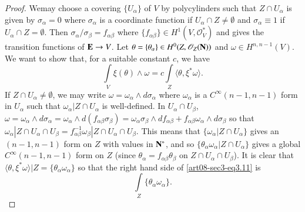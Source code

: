 \begin{proof}
We\pageoriginale may choose a covering $\{U_{\alpha}\}$ of $V$ by polycylinders such that $Z\cap U_{\alpha}$ is given by $\sigma_{\alpha}=0$ where $\sigma_{\alpha}$ is a coordinate function if $U_{\alpha}\cap Z\neq \emptyset$ and $\sigma_{\alpha}\equiv 1$ if $U_{\alpha}\cap Z=\emptyset$. Then $\sigma_{\alpha}/\sigma_{\beta}=f_{\alpha\beta}$ where $\{f_{\alpha\beta}\}\in H^{1}(V,\mathscr{O}^{*}_{V})$ and gives the transition functions of $\mathbf{E}\to V$. Let $\theta=\{\theta_{\alpha}\}\in H^{0}(Z,\mathscr{O}_{Z}(\mathbf{N}))$ and $\omega\in H^{n,n-1}(V)$. We want to show that, for a suitable constant $c$, we have
\begin{equation}
\int\limits_{V}\xi(\theta)\wedge \omega=c\int\limits_{Z}\langle \theta,\xi^{*}\omega\rangle.\label{art08-sec3-eq3.11}
\end{equation}
If $Z\cap U_{\alpha}\neq \emptyset$, we may write $\omega=\omega_{\alpha}\wedge d\sigma_{\alpha}$ where $\omega_{\alpha}$ is a $C^{\infty}(n-1,n-1)$ form in $U_{\alpha}$ such that $\omega_{\alpha}|Z\cap U_{\alpha}$ is well-defined. In $U_{\alpha}\cap U_{\beta}$, $\omega=\omega_{\alpha}\wedge d\sigma_{\alpha}=\omega_{\alpha}\wedge d(f_{\alpha\beta}\sigma_{\beta})=\omega_{\alpha}\sigma_{\beta}\wedge df_{\alpha\beta}+f_{\alpha\beta}\omega_{\alpha}\wedge d\sigma_{\beta}$ so that $\omega_{\alpha}|Z\cap U_{\alpha}\cap U_{\beta}=f^{-1}_{\alpha\beta}\omega_{\beta}|Z\cap U_{\alpha}\cap U_{\beta}$. This means that $\{\omega_{\alpha}|Z\cap U_{\alpha}\}$ gives an $(n-1,n-1)$ form on $Z$ with values in $\mathbf{N}^{*}$, and so $\{\theta_{\alpha}\omega_{\alpha}|Z\cap U_{\alpha}\}$ gives a global $C^{\infty}(n-1,n-1)$ form on $Z$ (since $\theta_{\alpha}=f_{\alpha\beta}\theta_{\beta}$ on $Z\cap U_{\alpha}\cap U_{\beta}$). It is clear that $\langle \theta,\xi^{*}\omega\rangle |Z=\{\theta_{\alpha}\omega_{\alpha}\}$ so that the right hand side of \eqref{art08-sec3-eq3.11} is
\begin{equation}
\int\limits_{Z}\{\theta_{\alpha}\omega_{\alpha}\}.\label{art08-sec3-eq3.12}
\end{equation}


\end{proof}
